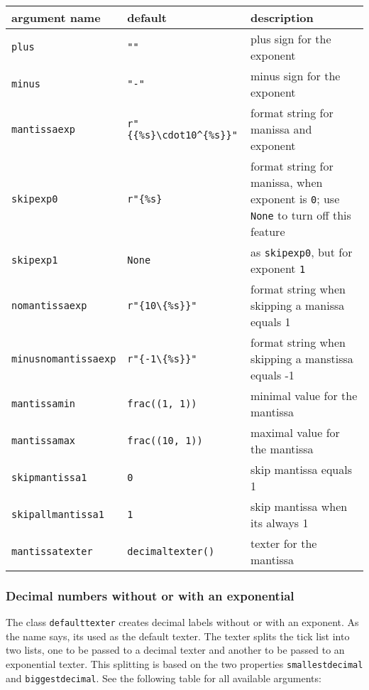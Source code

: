 \medskip
\begin{tabularx}{\linewidth}{ll>{\raggedright\arraybackslash}X}
argument name&default&description\\
\hline
\texttt{plus}&\texttt{""}&plus sign for the exponent\\
\texttt{minus}&\texttt{"-"}&minus sign for the exponent\\
\texttt{mantissaexp}&\texttt{r"\{\{\%s\}\textbackslash cdot10\textasciicircum\{\%s\}\}"}&format string for manissa and exponent\\
\texttt{skipexp0}&\texttt{r"\{\%s\}}&format string for manissa, when exponent is \texttt{0}; use \texttt{None} to turn off this feature\\
\texttt{skipexp1}&\texttt{None}&as \texttt{skipexp0}, but for exponent \texttt{1}\\
\texttt{nomantissaexp}&\texttt{r"\{10\textbackslash\{\%s\}\}"}&format string when skipping a manissa equals 1\\
\texttt{minusnomantissaexp}&\texttt{r"\{-1\textbackslash\{\%s\}\}"}&format string when skipping a manstissa equals -1\\
\texttt{mantissamin}&\texttt{frac((1, 1))}&minimal value for the mantissa\\
\texttt{mantissamax}&\texttt{frac((10, 1))}&maximal value for the mantissa\\
\texttt{skipmantissa1}&\texttt{0}&skip mantissa equals 1\\
\texttt{skipallmantissa1}&\texttt{1}&skip mantissa when its always 1\\
\texttt{mantissatexter}&\texttt{decimaltexter()}&texter for the mantissa\\
\end{tabularx}
\medskip

\subsubsection{Decimal numbers without or with an exponential}

The class \verb|defaulttexter| creates decimal labels without or
with an exponent. As the name says, its used as the default texter.
The texter splits the tick list into two lists, one to be passed to a
decimal texter and another to be passed to an exponential texter. This
splitting is based on the two properties \verb|smallestdecimal| and
\verb|biggestdecimal|. See the following table for all available
arguments:


